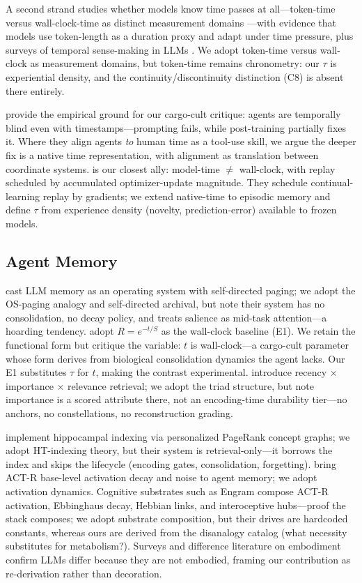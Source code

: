 \documentclass[letterpaper]{article}
\begin{document}
A second strand studies whether models know time passes at all---token-time versus wall-clock-time as distinct measurement domains \citep{discrete2025continuous}---with evidence that models use token-length as a duration proxy and adapt under time pressure, plus surveys of temporal sense-making in LLMs \citep{cacm2026time}. We adopt token-time versus wall-clock as measurement domains, but token-time remains chronometry: our $\tau$ is experiential density, and the continuity/discontinuity distinction (C8) is absent there entirely.

\citet{cheng2026blind} provide the empirical ground for our cargo-cult critique: agents are temporally blind even with timestamps---prompting fails, while post-training partially fixes it. Where they align agents \emph{to} human time as a tool-use skill, we argue the deeper fix is a native time representation, with alignment as translation between coordinate systems. \citet{forever2026} is our closest ally: model-time $\neq$ wall-clock, with replay scheduled by accumulated optimizer-update magnitude. They schedule continual-learning replay by gradients; we extend native-time to episodic memory and define $\tau$ from experience density (novelty, prediction-error) available to frozen models.

\subsection{Agent Memory}
\citet{packer2023memgpt} cast LLM memory as an operating system with self-directed paging; we adopt the OS-paging analogy and self-directed archival, but note their system has no consolidation, no decay policy, and treats salience as mid-task attention---a hoarding tendency. \citet{zhong2023memorybank} adopt $R=e^{-t/S}$ as the wall-clock baseline (E1). We retain the functional form but critique the variable: $t$ is wall-clock---a cargo-cult parameter whose form derives from biological consolidation dynamics the agent lacks. Our E1 substitutes $\tau$ for $t$, making the contrast experimental. \citet{park2023generative} introduce recency $\times$ importance $\times$ relevance retrieval; we adopt the triad structure, but note importance is a scored attribute there, not an encoding-time durability tier---no anchors, no constellations, no reconstruction grading.

\citet{gutierrez2024hipporag} implement hippocampal indexing via personalized PageRank concept graphs; we adopt HT-indexing theory, but their system is retrieval-only---it borrows the index and skips the lifecycle (encoding gates, consolidation, forgetting). \citet{liu2024actr} bring ACT-R base-level activation decay and noise to agent memory; we adopt activation dynamics. Cognitive substrates such as Engram \citep{engram2024} compose ACT-R activation, Ebbinghaus decay, Hebbian links, and interoceptive hubs---proof the stack composes; we adopt substrate composition, but their drives are hardcoded constants, whereas ours are derived from the disanalogy catalog (what necessity substitutes for metabolism?). Surveys \citep{niu2024survey} and difference literature on embodiment confirm LLMs differ because they are not embodied, framing our contribution as re-derivation rather than decoration.
\end{document}
